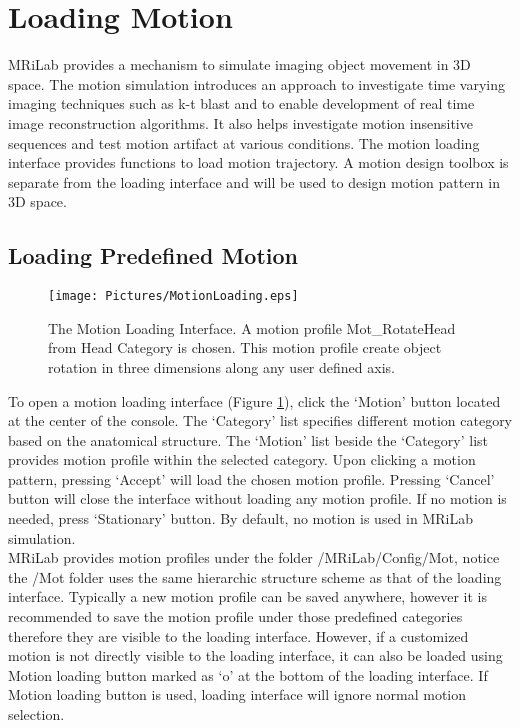 \documentclass{book}%
\begin{document}
\section{Loading Motion}
MRiLab provides a mechanism to simulate imaging object movement in 3D space. The motion simulation introduces an approach to investigate time varying imaging techniques such as k-t blast and to enable development of real time image reconstruction algorithms. It also helps investigate motion insensitive sequences and test motion artifact at various conditions. The motion loading interface provides functions to load motion trajectory. A motion design toolbox is separate from the loading interface and will be used to design motion pattern in 3D space.


\subsection{Loading Predefined Motion}

\begin{figure}[htbp]
	\centering
		\texttt{[image: Pictures/MotionLoading.eps]}
	\caption{The Motion Loading Interface. A motion profile Mot\_RotateHead from Head Category is chosen. This motion profile create object rotation in three dimensions along any user defined axis.}
	\label{fig:MotionLoading}
\end{figure}

To open a motion loading interface (Figure \ref{fig:MotionLoading}), click the `Motion' button located at the center of the console. The `Category' list specifies different motion category based on the anatomical structure. The `Motion' list beside the `Category' list provides motion profile within the selected category. Upon clicking a motion pattern, pressing `Accept' will load the chosen motion profile. Pressing `Cancel' button will close the interface without loading any motion profile. If no motion is needed, press `Stationary' button. By default, no motion is used in MRiLab simulation. \\

MRiLab provides motion profiles under the folder /MRiLab/Config/Mot, notice the /Mot folder uses the same hierarchic structure scheme as that of the loading interface. Typically a new motion profile can be saved anywhere, however it is recommended to save the motion profile under those predefined categories therefore they are visible to the loading interface. However, if a customized motion is not directly visible to the loading interface, it can also be loaded using Motion loading button marked as `o' at the bottom of the loading interface. If Motion loading button is used, loading interface will ignore normal motion selection.
\end{document}
